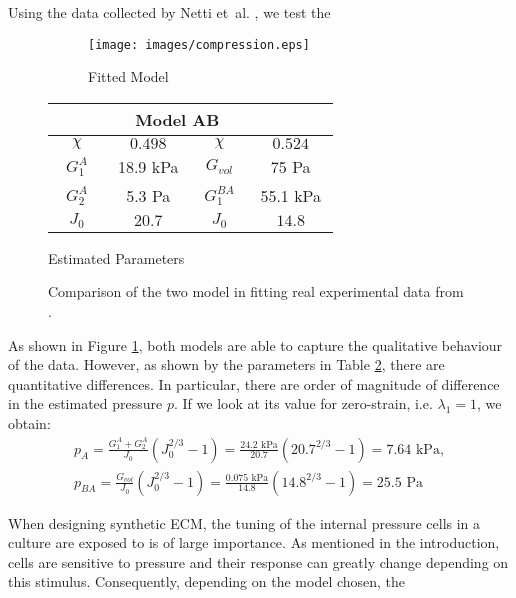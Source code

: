 Using the data collected by Netti et~al. \cite{Netti}, we test the 
\begin{figure}[h]
	\hspace{-8mm}
	\begin{subfigure}{0.62\textwidth}
		\hspace{6mm}
		\texttt{[image: images/compression.eps]}
		\caption{Fitted Model}
		\label{fit}
	\end{subfigure}
	\begin{subtable}{0.375\textwidth}
			\begin{tabular}{c | c ||c| c }		
				\hline\addlinespace[2pt]
				 \multicolumn{2}{c||}{Model A} &  \multicolumn{2}{c}{Model AB}\\[0.5mm]
				\hline\addlinespace[2pt]
				$\quad \chi\quad$ & $\quad0.498\quad$ &$\quad \chi\quad$&$\quad0.524\quad$\\[0.5mm]
				$G^A_1$ & 18.9 kPa&$G_{vol}$&75 Pa\\[0.5mm]
				$G^A_2$ & 5.3 Pa&$G^{BA}_{1}$& 55.1 kPa\\[0.5mm]
				$J_0$ & $20.7$&  $J_0$&$14.8$\\[0.5mm]
				\hline
			\end{tabular}
		\caption{Estimated Parameters}
		\label{param}
	\end{subtable}
\caption{Comparison of the two model in fitting real experimental data from \cite{Netti}.}		
\end{figure}

As shown in Figure \ref{fit}, both models are able to capture the qualitative behaviour of the data. However, as shown by the parameters in Table \ref{param}, there are quantitative differences. In particular, there are order of magnitude of difference in the estimated pressure $p$. If we look at its value for zero-strain, i.e. $\lambda_1=1$, we obtain: 
\begin{gather}
p_A = \frac{G^A_1+G^A_2}{J_0}(J_0^{2/3}-1) = \frac{24.2 \text{ kPa}}{20.7}(20.7^{2/3}-1) = 7.64 \text{ kPa},\\
p_{BA} = \frac{G_{vol}}{J_0}(J_0^{2/3}-1) = \frac{0.075 \text{ kPa}}{14.8}(14.8^{2/3}-1) = 25.5 \text{ Pa}
\end{gather}

When designing synthetic ECM, the tuning of the internal pressure cells in a culture are exposed to is of large importance. As mentioned in the introduction, cells are sensitive to pressure and their response can greatly change depending on this stimulus. Consequently, depending on the model chosen, the

